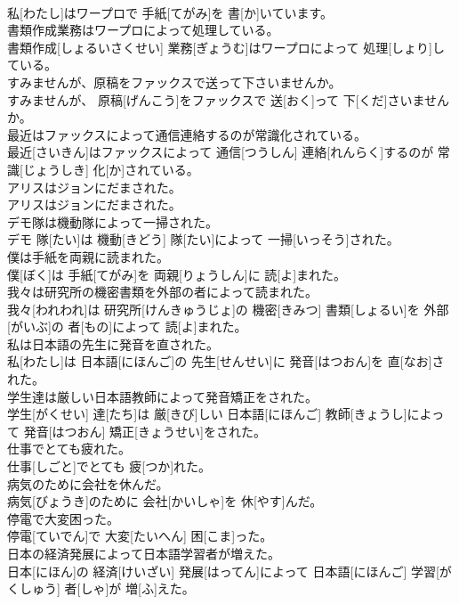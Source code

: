 \documentclass[8pt]{extreport}
\begin{document}
\begin{CJK}{UTF8}{min}
\\	私[わたし]はワープロで 手紙[てがみ]を 書[か]いています。
\\	書類作成業務はワープロによって処理している。	
\\	書類作成[しょるいさくせい] 業務[ぎょうむ]はワープロによって 処理[しょり]している。
\\	すみませんが、原稿をファックスで送って下さいませんか。	
\\	すみませんが、 原稿[げんこう]をファックスで 送[おく]って 下[くだ]さいませんか。
\\	最近はファックスによって通信連絡するのが常識化されている。	
\\	最近[さいきん]はファックスによって 通信[つうしん] 連絡[れんらく]するのが 常識[じょうしき] 化[か]されている。
\\	アリスはジョンにだまされた。	
\\	アリスはジョンにだまされた。
\\	デモ隊は機動隊によって一掃された。	
\\	デモ 隊[たい]は 機動[きどう] 隊[たい]によって 一掃[いっそう]された。
\\	僕は手紙を両親に読まれた。	
\\	僕[ぼく]は 手紙[てがみ]を 両親[りょうしん]に 読[よ]まれた。
\\	我々は研究所の機密書類を外部の者によって読まれた。	
\\	我々[われわれ]は 研究所[けんきゅうじょ]の 機密[きみつ] 書類[しょるい]を 外部[がいぶ]の 者[もの]によって 読[よ]まれた。
\\	私は日本語の先生に発音を直された。	
\\	私[わたし]は 日本語[にほんご]の 先生[せんせい]に 発音[はつおん]を 直[なお]された。
\\	学生達は厳しい日本語教師によって発音矯正をされた。	
\\	学生[がくせい] 達[たち]は 厳[きび]しい 日本語[にほんご] 教師[きょうし]によって 発音[はつおん] 矯正[きょうせい]をされた。
\\	仕事でとても疲れた。	
\\	仕事[しごと]でとても 疲[つか]れた。
\\	病気のために会社を休んだ。	
\\	病気[びょうき]のために 会社[かいしゃ]を 休[やす]んだ。
\\	停電で大変困った。	
\\	停電[ていでん]で 大変[たいへん] 困[こま]った。
\\	日本の経済発展によって日本語学習者が増えた。	
\\	日本[にほん]の 経済[けいざい] 発展[はってん]によって 日本語[にほんご] 学習[がくしゅう] 者[しゃ]が 増[ふ]えた。

\end{CJK}
\end{document}
